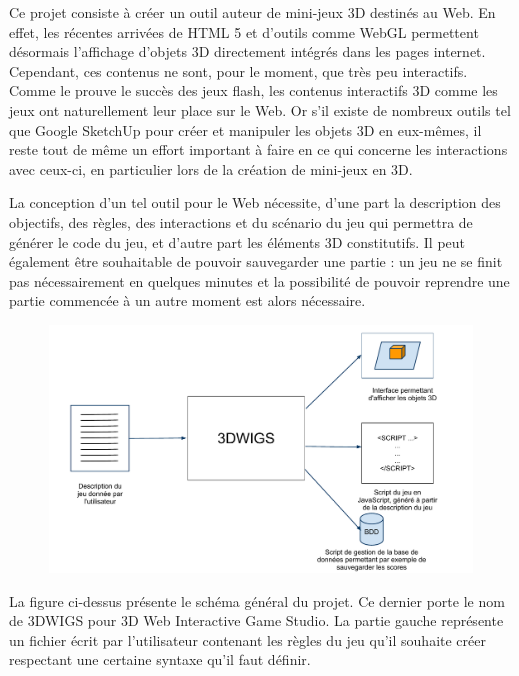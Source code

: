 Ce projet consiste à créer un outil auteur de mini-jeux 3D destinés au Web.
En effet, les récentes arrivées de HTML 5 et d'outils comme WebGL permettent désormais l'affichage d'objets 3D directement
intégrés dans les pages internet.
Cependant, ces contenus ne sont, pour le moment, que très peu interactifs.
Comme le prouve le succès des jeux flash, les contenus interactifs 3D comme les jeux ont naturellement leur place sur le Web.
Or s'il existe de nombreux outils tel que Google SketchUp pour créer et manipuler les objets 3D en eux-mêmes,
il reste tout de même un effort important à faire en ce qui concerne les interactions avec ceux-ci, en particulier lors de la création de mini-jeux en 3D.


\vspace{0.5cm}

La conception d'un tel outil pour le Web nécessite, d'une part la description des objectifs, des règles, des interactions et
du scénario du jeu qui permettra de générer le code du jeu, et d'autre part les éléments 3D constitutifs.
Il peut également être souhaitable de pouvoir sauvegarder une partie :
un jeu ne se finit pas nécessairement en quelques minutes et la possibilité de pouvoir reprendre une partie commencée à un autre moment est alors nécessaire.

\vspace{0.5cm}

\begin{figure}[h]
 \centering
 \includegraphics[width=\textwidth]{img/schema_general}
\end{figure}

\vspace{0.8cm}

La figure ci-dessus présente le schéma général du projet.
Ce dernier porte le nom de 3DWIGS pour 3D Web Interactive Game Studio.
La partie gauche représente un fichier écrit par l'utilisateur contenant les règles du jeu qu'il souhaite créer respectant
une certaine syntaxe qu'il faut définir.

